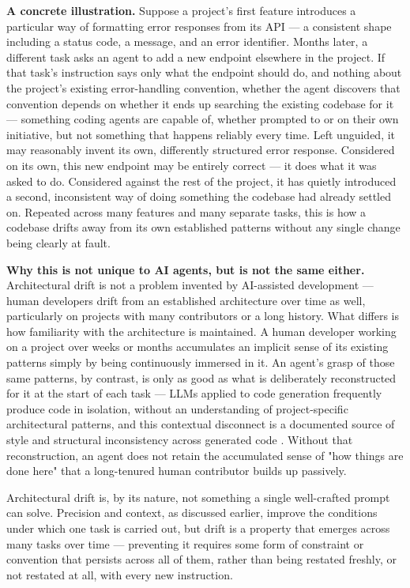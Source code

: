 \textbf{A concrete illustration.} Suppose a project's first feature introduces a particular way of formatting error responses from its API --- a consistent shape including a status code, a message, and an error identifier. Months later, a different task asks an agent to add a new endpoint elsewhere in the project. If that task's instruction says only what the endpoint should do, and nothing about the project's existing error-handling convention, whether the agent discovers that convention depends on whether it ends up searching the existing codebase for it --- something coding agents are capable of, whether prompted to or on their own initiative, but not something that happens reliably every time. Left unguided, it may reasonably invent its own, differently structured error response. Considered on its own, this new endpoint may be entirely correct --- it does what it was asked to do. Considered against the rest of the project, it has quietly introduced a second, inconsistent way of doing something the codebase had already settled on. Repeated across many features and many separate tasks, this is how a codebase drifts away from its own established patterns without any single change being clearly at fault.

\textbf{Why this is not unique to AI agents, but is not the same either.} Architectural drift is not a problem invented by AI-assisted development --- human developers drift from an established architecture over time as well, particularly on projects with many contributors or a long history. What differs is how familiarity with the architecture is maintained. A human developer working on a project over weeks or months accumulates an implicit sense of its existing patterns simply by being continuously immersed in it. An agent's grasp of those same patterns, by contrast, is only as good as what is deliberately reconstructed for it at the start of each task --- LLMs applied to code generation frequently produce code in isolation, without an understanding of project-specific architectural patterns, and this contextual disconnect is a documented source of style and structural inconsistency across generated code \cite{athale2025knowledge}. Without that reconstruction, an agent does not retain the accumulated sense of "how things are done here" that a long-tenured human contributor builds up passively.

Architectural drift is, by its nature, not something a single well-crafted prompt can solve. Precision and context, as discussed earlier, improve the conditions under which one task is carried out, but drift is a property that emerges across many tasks over time --- preventing it requires some form of constraint or convention that persists across all of them, rather than being restated freshly, or not restated at all, with every new instruction.

